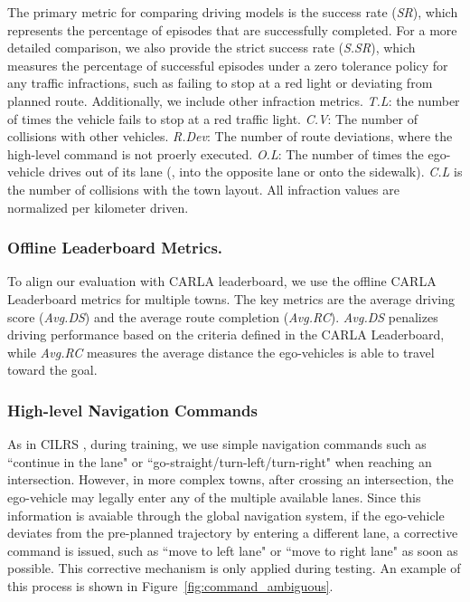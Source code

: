 The primary metric for comparing driving models is the success rate (\emph{SR}), which represents the percentage of episodes that are successfully completed. 
For a more detailed comparison, we also provide the strict success rate (\emph{S.SR}),
which measures the percentage of successful episodes under a zero tolerance policy for any traffic infractions, such as failing to stop at a red light or deviating from planned route.
Additionally, we include other infraction metrics.
\emph{T.L}: the number of times the vehicle fails to stop at a red traffic light.
\emph{C.V}: The number of collisions with other vehicles.
\emph{R.Dev}: The number of route deviations, where the high-level command is not proerly executed.
\emph{O.L}: The number of times the ego-vehicle drives out of its lane ({\eg}, into the opposite lane or onto the sidewalk).
\emph{C.L} is the number of collisions with the town layout. 
All infraction values are normalized per kilometer driven.


\subsubsection{Offline Leaderboard Metrics.}\label{lb_metrics}
\hspace{1pc}To align our evaluation with CARLA leaderboard\cite{Hu:2022}, we use the offline CARLA Leaderboard metrics for multiple towns. 
The key metrics are the average driving score (\emph{Avg.DS}) and the average route completion (\emph{Avg.RC}). 
\emph{Avg.DS} penalizes driving performance based on the criteria defined in the CARLA Leaderboard, 
while \emph{Avg.RC} measures the average distance the ego-vehicles is able to travel toward the goal.


\subsubsection{High-level Navigation Commands} 
\hspace{1pc}As in CILRS \cite{Codevilla:2019}, during training, we use simple navigation commands such as ``continue in the lane" or ``go-straight/turn-left/turn-right" when reaching an intersection.
However, in more complex towns, after crossing an intersection, the ego-vehicle may legally enter any of the multiple available lanes. 
Since this information is avaiable through the global navigation system, if the ego-vehicle deviates from the pre-planned trajectory by entering a different lane, a corrective command is issued, such as ``move to left lane" or ``move to right lane" as soon as possible. 
This corrective mechanism is only applied during testing. 
An example of this process is shown in Figure~\ref{fig:command_ambiguous}.

